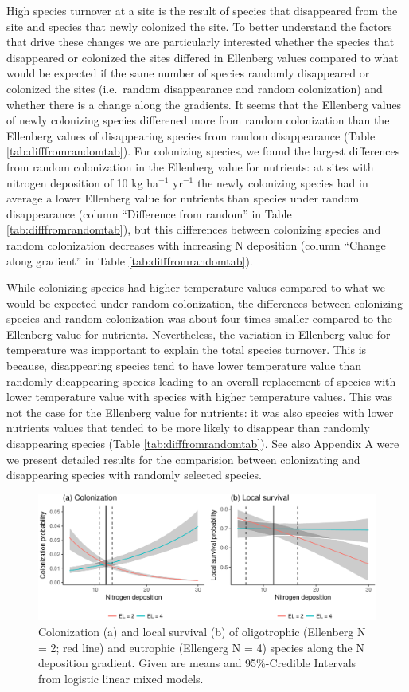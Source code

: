 \documentclass[fleqn,10pt,lineno]{wlpeerj} %
\theoremstyle{definition}
\theoremstyle{definition}
\theoremstyle{definition}
\theoremstyle{remark}
\begin{document}
High species turnover at a site is the result of species that
disappeared from the site and species that newly colonized the site. To
better understand the factors that drive these changes we are
particularly interested whether the species that disappeared or
colonized the sites differed in Ellenberg values compared to what would
be expected if the same number of species randomly disappeared or
colonized the sites (i.e.~random disappearance and random colonization)
and whether there is a change along the gradients. It seems that the
Ellenberg values of newly colonizing species differened more from random
colonization than the Ellenberg values of disappearing species from
random disappearance (Table \ref{tab:difffromrandomtab}). For colonizing
species, we found the largest differences from random colonization in
the Ellenberg value for nutrients: at sites with nitrogen deposition of
10 kg ha\(^{-1}\) yr\(^{-1}\) the newly colonizing species had in
average a lower Ellenberg value for nutrients than species under random
disappearance (column ``Difference from random'' in Table
\ref{tab:difffromrandomtab}), but this differences between colonizing
species and random colonization decreases with increasing N deposition
(column ``Change along gradient'' in Table \ref{tab:difffromrandomtab}).

While colonizing species had higher temperature values compared to what
we would be expected under random colonization, the differences between
colonizing species and random colonization was about four times smaller
compared to the Ellenberg value for nutrients. Nevertheless, the
variation in Ellenberg value for temperature was impportant to explain
the total species turnover. This is because, disappearing species tend
to have lower temperature value than randomly dieappearing species
leading to an overall replacement of species with lower temperature
value with species with higher temperature values. This was not the case
for the Ellenberg value for nutrients: it was also species with lower
nutrients values that tended to be more likely to disappear than
randomly disappearing species (Table \ref{tab:difffromrandomtab}). See
also Appendix A were we present detailed results for the comparision
between colonizating and disappearing species with randomly selected
species.

\begin{figure}
\includegraphics[width=1\linewidth]{Manuscript_files/figure-latex/neff-1} \caption{Colonization (a) and local survival (b) of oligotrophic (Ellenberg N = 2; red line) and eutrophic (Ellengerg N = 4) species along the N deposition gradient. Given are means and 95\%-Credible Intervals from logistic linear mixed models.}\label{fig:neff}
\end{figure}
\end{document}
